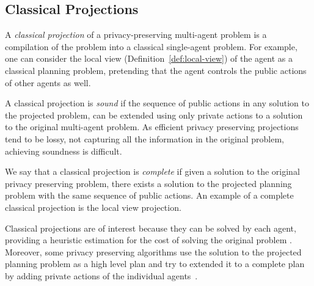 \documentclass[letterpaper]{article}
\theoremstyle{definition}
\begin{document}
\subsection{Classical Projections}


A {\em classical projection} of a privacy-preserving multi-agent problem is a compilation of the problem into a classical single-agent problem. For example, one can consider the local view (Definition~\ref{def:local-view}) of the agent as a classical planning problem, pretending that the agent controls the public actions of other agents as well.

A classical projection is {\em sound} if the sequence of public actions in any solution to the projected problem, can be extended using only private actions  to a solution to the original multi-agent problem. As efficient privacy preserving projections tend to be lossy, not capturing all the information in the original problem, achieving soundness is difficult.

We say that a classical projection is {\em complete} if given a solution to the original privacy preserving problem, there exists a solution to the projected planning problem with the same sequence of public actions. An example of a complete classical projection is the local view projection.


Classical projections are of interest because they can be solved by each agent, providing a heuristic estimation for the cost of solving the original problem \cite{nissim2014distributed}. Moreover, some privacy preserving algorithms use the solution to the projected planning problem as a high level plan and try to extended it to a complete plan by adding private actions of the individual agents~\cite{jakubuv2015multiagent,tozicka2015internally}.


\end{document}
